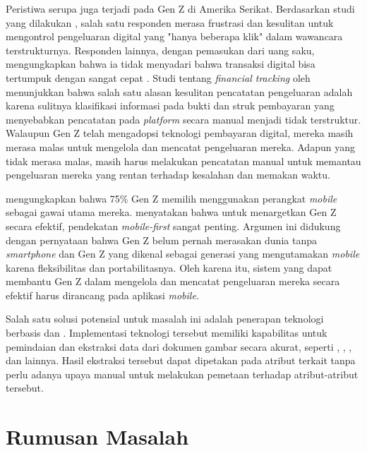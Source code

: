 Peristiwa serupa juga terjadi pada Gen Z di Amerika Serikat. Berdasarkan studi yang dilakukan , salah satu responden merasa frustrasi dan kesulitan untuk mengontrol pengeluaran digital yang "hanya beberapa klik" dalam wawancara terstrukturnya. Responden lainnya, dengan pemasukan dari uang saku, mengungkapkan bahwa ia tidak menyadari bahwa transaksi digital bisa tertumpuk dengan sangat cepat \parencite{lewis2019follow}. Studi tentang \emph{financial tracking} oleh  menunjukkan bahwa salah satu alasan kesulitan pencatatan pengeluaran adalah karena sulitnya klasifikasi informasi pada bukti dan struk pembayaran yang menyebabkan pencatatan pada \emph{platform} secara manual menjadi tidak terstruktur. Walaupun Gen Z telah mengadopsi teknologi pembayaran digital, mereka masih merasa malas untuk mengelola dan mencatat pengeluaran mereka. Adapun yang tidak merasa malas, masih harus melakukan pencatatan manual untuk memantau pengeluaran mereka yang rentan terhadap kesalahan dan memakan waktu. 

 mengungkapkan bahwa 75\% Gen Z memilih menggunakan perangkat \emph{mobile} sebagai gawai utama mereka.  menyatakan bahwa untuk menargetkan Gen Z secara efektif, pendekatan \emph{mobile-first} sangat penting. Argumen ini didukung dengan pernyataan bahwa Gen Z belum pernah merasakan dunia tanpa \emph{smartphone} dan Gen Z yang dikenal sebagai generasi yang mengutamakan \emph{mobile} karena fleksibilitas dan portabilitasnya. Oleh karena itu, sistem yang dapat membantu Gen Z dalam mengelola dan mencatat pengeluaran mereka secara efektif harus dirancang pada aplikasi \emph{mobile}.

Salah satu solusi potensial untuk masalah ini adalah penerapan teknologi berbasis \cvfull{} dan \dl{}. Implementasi teknologi tersebut memiliki kapabilitas untuk pemindaian dan ekstraksi data dari dokumen gambar secara akurat, seperti \ocrfull, \cnnfull, \transformer, dan lainnya. Hasil ekstraksi tersebut dapat dipetakan pada atribut terkait tanpa perlu adanya upaya manual untuk melakukan pemetaan terhadap atribut-atribut tersebut.


\section{Rumusan Masalah}
\label{sec:rumusan-masalah}

